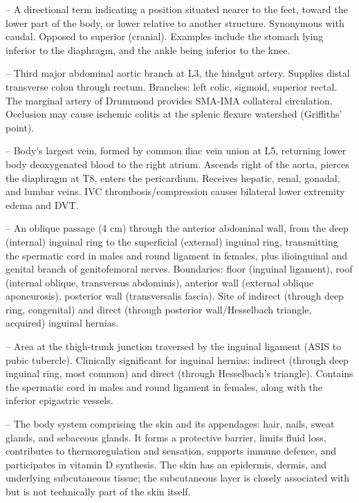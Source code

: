 -- A directional term indicating a position situated nearer to the feet, toward the lower part of the body, or lower relative to another structure. Synonymous with caudal. Opposed to superior (cranial). Examples include the stomach lying inferior to the diaphragm, and the ankle being inferior to the knee.

-- Third major abdominal aortic branch at L3, the hindgut artery. Supplies distal transverse colon through rectum. Branches: left colic, sigmoid, superior rectal. The marginal artery of Drummond provides SMA-IMA collateral circulation. Occlusion may cause ischemic colitis at the splenic flexure watershed (Griffiths' point).

-- Body's largest vein, formed by common iliac vein union at L5, returning lower body deoxygenated blood to the right atrium. Ascends right of the aorta, pierces the diaphragm at T8, enters the pericardium. Receives hepatic, renal, gonadal, and lumbar veins. IVC thrombosis/compression causes bilateral lower extremity edema and DVT.

-- An oblique passage (4 cm) through the anterior abdominal wall, from the deep (internal) inguinal ring to the superficial (external) inguinal ring, transmitting the spermatic cord in males and round ligament in females, plus ilioinguinal and genital branch of genitofemoral nerves. Boundaries: floor (inguinal ligament), roof (internal oblique, transversus abdominis), anterior wall (external oblique aponeurosis), posterior wall (transversalis fascia). Site of indirect (through deep ring, congenital) and direct (through posterior wall/Hesselbach triangle, acquired) inguinal hernias.

-- Area at the thigh-trunk junction traversed by the inguinal ligament (ASIS to pubic tubercle). Clinically significant for inguinal hernias: indirect (through deep inguinal ring, most common) and direct (through Hesselbach's triangle). Contains the spermatic cord in males and round ligament in females, along with the inferior epigastric vessels.

-- The body system comprising the skin and its appendages: hair, nails, sweat glands, and sebaceous glands. It forms a protective barrier, limits fluid loss, contributes to thermoregulation and sensation, supports immune defence, and participates in vitamin D synthesis. The skin has an epidermis, dermis, and underlying subcutaneous tissue; the subcutaneous layer is closely associated with but is not technically part of the skin itself.

